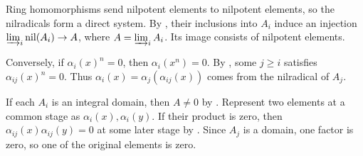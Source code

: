 Ring homomorphisms send nilpotent elements to nilpotent elements, so the nilradicals form a direct system. By , their inclusions into $A_i$ induce an injection $\varinjlim_i\operatorname{nil}(A_i)\to A$, where $A=\varinjlim_iA_i$. Its image consists of nilpotent elements.

Conversely, if $\alpha_i(x)^n=0$, then $\alpha_i(x^n)=0$. By , some $j\geq i$ satisfies $\alpha_{ij}(x)^n=0$. Thus $\alpha_i(x)=\alpha_j(\alpha_{ij}(x))$ comes from the nilradical of $A_j$.

If each $A_i$ is an integral domain, then $A\neq0$ by . Represent two elements at a common stage as $\alpha_i(x),\alpha_i(y)$. If their product is zero, then $\alpha_{ij}(x)\alpha_{ij}(y)=0$ at some later stage by . Since $A_j$ is a domain, one factor is zero, so one of the original elements is zero.
